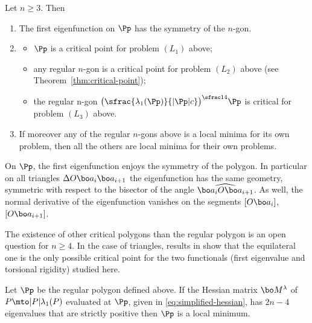 \begin{propo}
Let $n \geq 3$. Then
\begin{enumerate}
\item The first eigenfunction on $\Pp$ has the symmetry of the $n$-gon.
\item\mbox{}\vspace*{-1.2\baselineskip}
\begin{itemize}
\item $\Pp$ is a critical point for problem $(L_1)$ above;
\item any regular $n$-gon is a critical point for problem $(L_2)$ above (see Theorem~\ref{thm:critical-point});
\item the regular n-gon $\bigl(\sfrac{\lambda_1(\Pp)}{|\Pp| c}\bigr)^{\sfrac14} \Pp$ is critical for problem $(L_3)$ above.
\end{itemize}
\item
If moreover any of the regular $n$-gons above is a local minima for its own problem, then all the others are local minima for their own problems.
\end{enumerate}
\label{thm:criticality}
\end{propo}

\begin{rem}
On $\Pp$, the first eigenfunction enjoys the symmetry of the polygon. In particular on all triangles $\Delta O\bo a_i \bo a_{i+1}$ the eigenfunction has the same geometry, symmetric with respect to the bisector of the angle $\widehat {\bo a_iO \bo a_{i+1}}$. As well, the normal derivative of the eigenfunction vanishes on the segments $[O\bo a_i]$, $[O\bo a_{i+1}]$.
\label{rem:symm-eigenfunction}
\end{rem}

\begin{rem}
The existence of other critical polygons than the regular polygon is an open question for $n \geq 4$. In the case of triangles, results in \cite{FragalaVelichkov19} show that the equilateral one is the only possible critical point for the two functionals (first eigenvalue and torsional rigidity) studied here.
\end{rem}

\begin{propo}
Let $\Pp$ be the regular polygon defined above. If the Hessian matrix $\bo M^\lambda$ of $P\mto |P|\lambda_1(P)$ evaluated at $\Pp$, given in \eqref{eq:simplified-hessian}, has $2n-4$ eigenvalues that are strictly positive then $\Pp$ is a local minimum.
\label{prop:justification-2n-4}
\end{propo}

